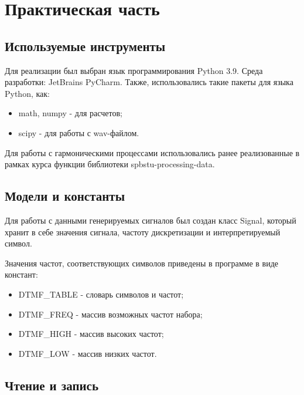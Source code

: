 \chapter{Практическая часть} \label{ch2}
	

\section{Используемые инструменты} \label{ch2:title-abbr} %
	Для реализации был выбран язык программирования Python 3.9. Среда разработки: JetBrains PyCharm.
	Также, использовались такие пакеты для языка Python, как: 
\begin{itemize}
	\item math, numpy - для расчетов;
	\item scipy - для работы с wav-файлом.
\end{itemize}

Для работы с гармоническими процессами использовались ранее реализованные в рамках курса функции библиотеки spbstu-processing-data. 

\section{Модели и константы}

Для работы с данными генерируемых сигналов был создан класс Signal, который хранит в себе значения сигнала, частоту дискретизации и интерпретируемый символ.

Значения частот, соответствующих символов приведены в программе в виде констант:
\begin{itemize}
	\item DTMF\_TABLE - словарь символов и частот;
	\item DTMF\_FREQ - массив возможных частот набора;
	\item DTMF\_HIGH - массив высоких частот;
	\item DTMF\_LOW - массив низких частот.
\end{itemize}

\section{Чтение и запись}

